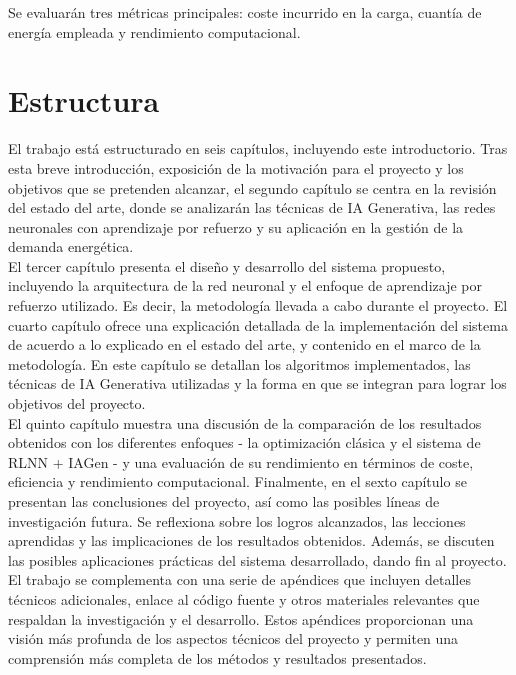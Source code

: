 Se evaluarán tres métricas principales: coste incurrido en la carga, cuantía de energía empleada y 
rendimiento computacional.

\section{Estructura}
El trabajo está estructurado en seis capítulos, incluyendo este introductorio. Tras esta breve 
introducción, exposición de la motivación para el proyecto y los objetivos que se pretenden 
alcanzar, el segundo capítulo se centra en la revisión del estado del arte, donde se analizarán las 
técnicas de IA Generativa, las redes neuronales con aprendizaje por refuerzo y su aplicación en la 
gestión de la demanda energética.\\

El tercer capítulo presenta el diseño y desarrollo del sistema propuesto, incluyendo la 
arquitectura de la red neuronal y el enfoque de aprendizaje por refuerzo utilizado. Es decir, la 
metodología llevada a cabo durante el proyecto. El cuarto capítulo ofrece una explicación 
detallada de la implementación del sistema de acuerdo a lo explicado en el estado del arte, y 
contenido en el marco de la metodología. En este capítulo se detallan los algoritmos
implementados, las técnicas de IA Generativa utilizadas y la forma en que se integran para
lograr los objetivos del proyecto.\\

El quinto capítulo muestra una discusión de la comparación de los resultados obtenidos con los
diferentes enfoques - la optimización clásica y el sistema de RLNN + IAGen - y una evaluación 
de su rendimiento en términos de coste, eficiencia y rendimiento computacional. Finalmente, en
el sexto capítulo se presentan las conclusiones del proyecto, así como las posibles líneas de
investigación futura. Se reflexiona sobre los logros alcanzados, las lecciones aprendidas y
las implicaciones de los resultados obtenidos. Además, se discuten las posibles aplicaciones
prácticas del sistema desarrollado, dando fin al proyecto.\\ 

El trabajo se complementa con una serie de apéndices que incluyen detalles técnicos adicionales,
enlace al código fuente y otros materiales relevantes que respaldan la investigación y el 
desarrollo. Estos apéndices proporcionan una visión más profunda de los aspectos técnicos
del proyecto y permiten una comprensión más completa de los métodos y resultados presentados.

\vfill
